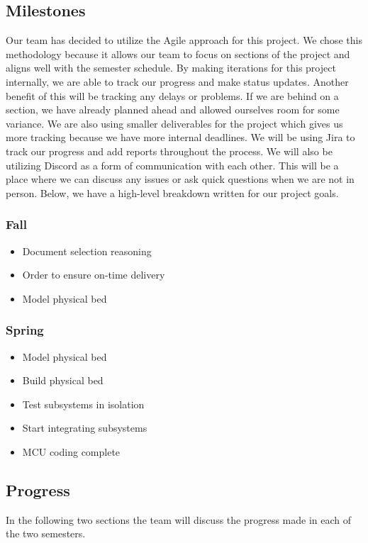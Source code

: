 \subsection{Milestones}
Our team has decided to utilize the Agile approach for this project. We chose this methodology because it allows our team to focus on sections of the project and aligns well with the semester schedule. By making iterations for this project internally, we are able to track our progress and make status updates. Another benefit of this will be tracking any delays or problems. If we are behind on a section, we have already planned ahead and allowed ourselves room for some variance. We are also using smaller deliverables for the project which gives us more tracking because we have more internal deadlines. We will be using Jira to track our progress and add reports throughout the process. We will also be utilizing Discord as a form of communication with each other. This will be a place where we can discuss any issues or ask quick questions when we are not in person. Below, we have a high-level breakdown written for our project goals.
\subsubsection{Fall}
\begin{itemize}
        \item Document selection reasoning
        \item Order to ensure on-time delivery
        \item Model physical bed
\end{itemize}
\subsubsection{Spring}
\begin{itemize}
    \item Model physical bed
    \item Build physical bed
    \item Test subsystems in isolation
    \item Start integrating subsystems
    \item MCU coding complete
\end{itemize}

\subsection{Progress}
In the following two sections the team will discuss the progress made in each of the two semesters.
